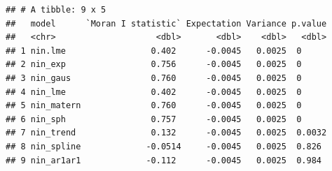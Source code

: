 \documentclass[
]{book}
\newenvironment{Shaded}{\begin{snugshade}}{\end{snugshade}}
\newcommand{\AttributeTok}[1]{\textcolor[rgb]{0.13,0.29,0.53}{#1}}
\newcommand{\ControlFlowTok}[1]{\textcolor[rgb]{0.13,0.29,0.53}{\textbf{#1}}}
\newcommand{\DecValTok}[1]{\textcolor[rgb]{0.00,0.00,0.81}{#1}}
\newcommand{\FunctionTok}[1]{\textcolor[rgb]{0.13,0.29,0.53}{\textbf{#1}}}
\newcommand{\NormalTok}[1]{#1}
\newcommand{\OtherTok}[1]{\textcolor[rgb]{0.56,0.35,0.01}{#1}}
\newcommand{\SpecialCharTok}[1]{\textcolor[rgb]{0.81,0.36,0.00}{\textbf{#1}}}
\newcommand{\StringTok}[1]{\textcolor[rgb]{0.31,0.60,0.02}{#1}}
\begin{document}
\begin{Shaded}
\end{Shaded}

\begin{verbatim}
## # A tibble: 9 x 5
##   model      `Moran I statistic` Expectation Variance p.value
##   <chr>                    <dbl>       <dbl>    <dbl>   <dbl>
## 1 nin.lme                 0.402      -0.0045   0.0025  0     
## 2 nin_exp                 0.756      -0.0045   0.0025  0     
## 3 nin_gaus                0.760      -0.0045   0.0025  0     
## 4 nin_lme                 0.402      -0.0045   0.0025  0     
## 5 nin_matern              0.760      -0.0045   0.0025  0     
## 6 nin_sph                 0.757      -0.0045   0.0025  0     
## 7 nin_trend               0.132      -0.0045   0.0025  0.0032
## 8 nin_spline             -0.0514     -0.0045   0.0025  0.826 
## 9 nin_ar1ar1             -0.112      -0.0045   0.0025  0.984
\end{verbatim}
\end{document}
